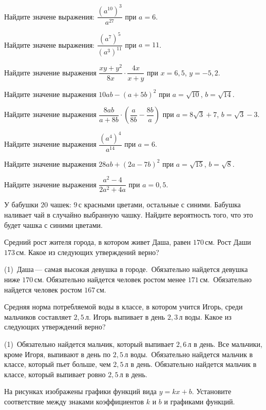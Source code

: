 %
%

\begin{class}[number=1]
	\begin{listofex}
		\item Найдите значене выражения: \( \dfrac{(a^{10})^{3}}{a^{27}} \) при \( a=6 \).
		\item Найдите значене выражения: \( \dfrac{(a^{7})^{5}}{(a^{3})^{11}} \) при \( a=11 \).
		\item Найдите значение выражения  \( \dfrac{xy+y^{2}}{8x}\cdot\dfrac{4x}{x+y} \)  при \( x = 6,5 \), \( y = -5,2 \).
		\item Найдите значение выражения  \( 10ab-(a+5b)^{2} \)  при \( a = \sqrt{10} \), \( b = \sqrt{14} \).
		\item Найдите значение выражения  \( \dfrac{8ab}{a+8b}\cdot\left( \dfrac{a}{8b}-\dfrac{8b}{a} \right) \)  при \( a = 8\sqrt{3}+7 \), \( b = \sqrt{3}-3 \).
		\item Найдите значение выражения  \( \dfrac{(a^{4})^{4}}{a^{14}} \)  при \( a = 6 \).
		\item Найдите значение выражения  \( 28ab+(2a-7b)^{2} \)  при \( a = \sqrt{15} \), \( b = \sqrt{8} \).
		\item Найдите значение выражения  \( \dfrac{a^{2}-4}{2a^{2}+4a} \)  при \( a = 0,5 \).
		\item У бабушки \( 20 \) чашек: \( 9 \) с красными цветами, остальные с синими. Бабушка наливает чай в случайно выбранную чашку. Найдите вероятность того, что это будет чашка с синими цветами.
		\item Средний рост жителя города, в котором живет Даша, равен \( 170 \) см. Рост Даши \( 173 \) см. Какое из следующих утверждений верно?
		\begin{tasks}(1)
			\task  Даша --- самая высокая девушка в городе.
			\task  Обязательно найдется девушка ниже \( 170 \) см.
			\task Обязательно найдется человек ростом менее \( 171 \) см.
			\task  Обязательно найдется человек ростом \( 167 \) см.
		\end{tasks}
		\item Средняя норма потребляемой воды в классе, в котором учится Игорь, среди мальчиков составляет \( 2,5 \) л. Игорь выпивает в день \( 2,3 \) л воды. Какое из следующих утверждений верно?
		\begin{tasks}(1)
			\task  Обязательно найдется мальчик, который выпивает \( 2,6 \) л в день.
			\task Все мальчики, кроме Игоря, выпивают в день по \( 2,5 \) л воды.
			\task  Обязательно найдется мальчик в классе, который пьет больше, чем \( 2,5 \) л в день.
			\task Обязательно найдется мальчик в классе, который выпивает ровно \( 2,5 \) л в день.
		\end{tasks}
	\newpage
		\item На рисунках изображены графики функций вида \( y=kx + b \). Установите соответствие между знаками коэффициентов \( k \) и \( b \) и графиками функций.
		

\end{listofex}
\end{class}
